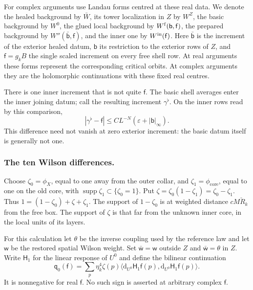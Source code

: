 \documentclass[11pt,letterpaper,reqno]{amsart}
\theoremstyle{definition}
\theoremstyle{remark}
\begin{document}
For complex arguments use Landau forms centred at these real
data. We denote the healed background by \(\bar W\), its
tower localization in \(Z\) by \(W^Z\), the basic background
by \(W^0\), the glued local background by
\(W^{\rm f}(\mathsf b,\mathsf f)\), the prepared background
by \(W''(\bar{\mathsf b},\mathsf f)\), and the inner one
by \(W^{\rm in}(\mathsf f)\).
Here \(\bar{\mathsf b}\) is the increment of the exterior
healed datum, \(\mathsf b\) its restriction to the exterior
rows of \(Z\), and \(\mathsf f=g_kB\) the single scaled
increment on every free shell row.
At real arguments these forms represent the corresponding
critical orbits. At complex arguments they are the holomorphic
continuations with these fixed real centres.

There is one inner increment that is not quite \(\mathsf f\).
The basic shell averages enter the inner joining datum; call
the resulting increment \(\gamma^\flat\). On the inner rows
read by this comparison,
\begin{equation}\label{eq:main-inner-increment}
 |\gamma^\flat-\mathsf f|
       \le CL^{-N}(\varepsilon+|\mathsf b|_\infty).
\end{equation}
This difference need not vanish at zero exterior increment:
the basic datum itself is generally not one.

\subsubsection*{The ten Wilson differences.}

Choose \(\zeta_0=\phi_X\), equal to one away from the outer
collar, and \(\zeta_1=\phi_{\mathrm{core}}\), equal to one
on the old core, with
\(\operatorname{supp}\zeta_1\subset\{\zeta_0=1\}\). Put
\(\zeta=\zeta_0(1-\zeta_1)=\zeta_0-\zeta_1\).
Thus \(1=(1-\zeta_0)+\zeta+\zeta_1\).
The support of \(1-\zeta_0\) is at weighted distance
\(cM\check R_k\) from the free box. The support of \(\zeta\)
is that far from the unknown inner core, in the local units
of its layers.

For this calculation let \(\theta\) be the inverse coupling
used by the reference law and let \(\mathsf w\) be the
restored spatial Wilson weight. Set
\(\bar{\mathsf w}=\mathsf w\) outside \(Z\) and
\(\bar{\mathsf w}=\theta\) in \(Z\).
Write \(\mathsf H_1\) for the linear response of \(U^0\)
and define the bilinear continuation
\[
 \mathsf q_0(\mathsf f)=
 \sum_p\eta_k^4\zeta(p)
       \langle \mathrm d_{U^0}\mathsf H_1\mathsf f(p),
                         \mathrm d_{U^0}\mathsf H_1\mathsf f(p)\rangle .
\]
It is nonnegative for real \(\mathsf f\). No such sign
is asserted at arbitrary complex \(\mathsf f\).
\end{document}
